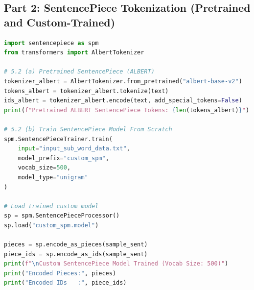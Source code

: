 \documentclass[12pt,a4paper]{report}
\begin{document}
\subsection{Part 2: SentencePiece Tokenization (Pretrained and Custom-Trained)}
\begin{lstlisting}[language=Python, caption={Experiment 5.2: SentencePiece Implementation}]
import sentencepiece as spm
from transformers import AlbertTokenizer

# 5.2 (a) Pretrained SentencePiece (ALBERT)
tokenizer_albert = AlbertTokenizer.from_pretrained("albert-base-v2")
tokens_albert = tokenizer_albert.tokenize(text)
ids_albert = tokenizer_albert.encode(text, add_special_tokens=False)
print(f"Pretrained ALBERT SentencePiece Tokens: {len(tokens_albert)}")

# 5.2 (b) Train SentencePiece Model From Scratch
spm.SentencePieceTrainer.train(
    input="input_sub_word_data.txt",
    model_prefix="custom_spm",
    vocab_size=500,
    model_type="unigram"
)

# Load trained custom model
sp = spm.SentencePieceProcessor()
sp.load("custom_spm.model")

pieces = sp.encode_as_pieces(sample_sent)
piece_ids = sp.encode_as_ids(sample_sent)
print(f"\nCustom SentencePiece Model Trained (Vocab Size: 500)")
print("Encoded Pieces:", pieces)
print("Encoded IDs   :", piece_ids)
\end{lstlisting}
\end{document}
